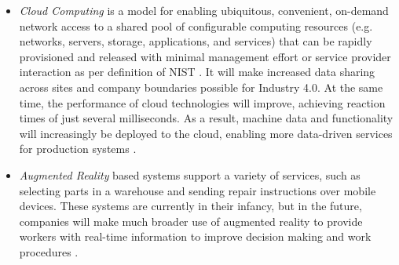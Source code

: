 \begin{itemize}
\item \textit{Cloud Computing} is a model for enabling ubiquitous, convenient, on-demand network access to a shared pool of configurable computing resources (e.g. networks, servers, storage, applications, and services) that can be rapidly provisioned and released with minimal management effort or service provider interaction as per definition of \acs{NIST} \cite{MELLNIST}. It will make increased data sharing across sites and company boundaries possible for Industry 4.0. At the same time, the performance of cloud technologies will improve, achieving reaction times of just several milliseconds. As a result, machine data and functionality will increasingly be deployed to the cloud, enabling more data-driven services for production systems \cite{IN4BCG,IN4DESIGN}.
\item \textit{Augmented Reality} based systems support a variety of services, such as selecting parts in a warehouse and sending repair instructions over mobile devices. These systems are currently in their infancy, but in the future, companies will make much broader use of augmented reality to provide workers with real-time information to improve decision making and work procedures \cite{IN4BCG}.
\end{itemize}
